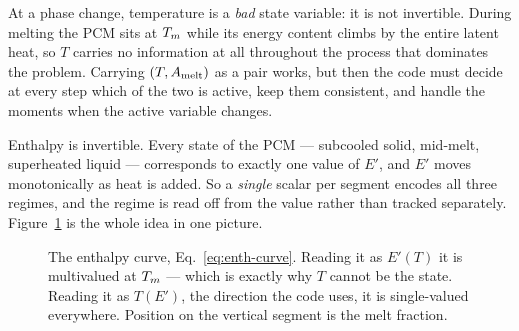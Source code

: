 At a phase change, temperature is a \emph{bad} state variable: it is not
invertible. During melting the PCM sits at $T_{m}$ while its energy content
climbs by the entire latent heat, so $T$ carries no information at all
throughout the process that dominates the problem. Carrying $(T, A_{\mathrm{melt}})$ as a
pair works, but then the code must decide at every step which of the two is
active, keep them consistent, and handle the moments when the active variable
changes.

Enthalpy is invertible. Every state of the PCM --- subcooled solid, mid-melt,
superheated liquid --- corresponds to exactly one value of $E'$, and $E'$ moves
monotonically as heat is added. So a \emph{single} scalar per segment encodes
all three regimes, and the regime is read off from the value rather than tracked
separately. Figure~\ref{fig:enthalpy-curve} is the whole idea in one picture.

\begin{figure}[htbp]
\centering
{}
\caption{The enthalpy curve, Eq.~\eqref{eq:enth-curve}. Reading it as
$E'(T)$ it is multivalued at $T_{m}$ --- which is exactly why $T$ cannot be the
state. Reading it as $T(E')$, the direction the code uses, it is single-valued
everywhere. Position on the vertical segment is the melt fraction.}
\label{fig:enthalpy-curve}
\end{figure}

